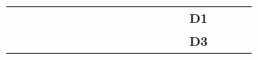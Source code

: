 \begin{landscape}
\begin{table}[h!]
\begin{tabular}{lcllcllcllcllcllcl}
\multicolumn{1}{l|}{}     & \multicolumn{1}{c|}{}                                                                                                    &                              & \multicolumn{1}{l|}{\cellcolor[HTML]{C0C0C0}}   & \multicolumn{1}{c|}{\cellcolor[HTML]{C0C0C0}}                                                                                                       & \cellcolor[HTML]{C0C0C0}                              & \multicolumn{1}{l|}{}   & \multicolumn{1}{c|}{}                                                                                                    &                               & \multicolumn{1}{l|}{\cellcolor[HTML]{C0C0C0}}   & \multicolumn{1}{c|}{\cellcolor[HTML]{C0C0C0}}                                                                                             & \cellcolor[HTML]{C0C0C0}                              & \multicolumn{1}{l|}{}   & \multicolumn{1}{c|}{}                                                                                                               & {\bf D1}                      & \multicolumn{1}{l|}{\cellcolor[HTML]{C0C0C0}}   & \multicolumn{1}{c|}{\cellcolor[HTML]{C0C0C0}}                                                                                                         & \cellcolor[HTML]{C0C0C0}                              \\
\multicolumn{1}{l|}{}     & \multicolumn{1}{c|}{}                                                                                                    &                              & \multicolumn{1}{l|}{\cellcolor[HTML]{C0C0C0}}   & \multicolumn{1}{c|}{\cellcolor[HTML]{C0C0C0}}                                                                                                       & \cellcolor[HTML]{C0C0C0}                              & \multicolumn{1}{l|}{}   & \multicolumn{1}{c|}{}                                                                                                    &                               & \multicolumn{1}{l|}{\cellcolor[HTML]{C0C0C0}}   & \multicolumn{1}{c|}{\cellcolor[HTML]{C0C0C0}}                                                                                             & \cellcolor[HTML]{C0C0C0}                              & \multicolumn{1}{l|}{}   & \multicolumn{1}{c|}{}                                                                                                               & {\bf D3}                      & \multicolumn{1}{l|}{\cellcolor[HTML]{C0C0C0}}   & \multicolumn{1}{c|}{\cellcolor[HTML]{C0C0C0}}                                                                                                         & \cellcolor[HTML]{C0C0C0}                              \\ \cline{1-1} \cline{3-4} \cline{6-7} \cline{9-10} \cline{12-13} \cline{15-16} \cline{18-18} 

\end{tabular}
\end{table}
\end{landscape}
